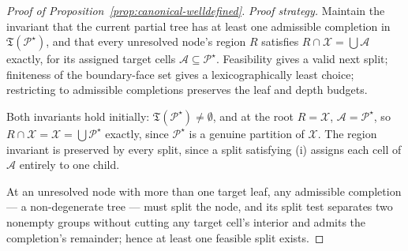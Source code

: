 \documentclass[11pt]{article}
\theoremstyle{plain}
\theoremstyle{definition}
\theoremstyle{remark}
\newcommand{\cX}{\mathcal{X}}
\newcommand{\cA}{\mathcal{A}}
\newcommand{\cP}{\mathcal{P}}
\begin{document}
\begin{proof}[Proof of Proposition~\ref{prop:canonical-welldefined}]
\emph{Proof strategy.} Maintain the invariant that the current partial tree
has at least one admissible completion in \(\mathfrak T(\cP^\star)\), and
that every unresolved node's region \(R\) satisfies
\(R\cap\cX=\bigcup\cA\) exactly, for its assigned target cells
\(\cA\subseteq\cP^\star\). Feasibility gives a valid next split;
finiteness of the boundary-face set gives a lexicographically least choice;
restricting to admissible completions preserves the leaf and depth budgets.

Both invariants hold initially: \(\mathfrak T(\cP^\star)\ne\emptyset\), and
at the root \(R=\cX\), \(\cA=\cP^\star\), so
\(R\cap\cX=\cX=\bigcup\cP^\star\) exactly, since \(\cP^\star\) is a genuine
partition of \(\cX\). The region invariant is preserved by every split,
since a split satisfying (i) assigns each cell of \(\cA\) entirely to one
child.

At an unresolved node with more than one target leaf, any admissible
completion --- a non-degenerate tree --- must split the node, and its split test
separates two nonempty groups without cutting any target cell's interior
and admits the completion's remainder; hence at least one feasible split
exists.


\end{proof}
\end{document}

